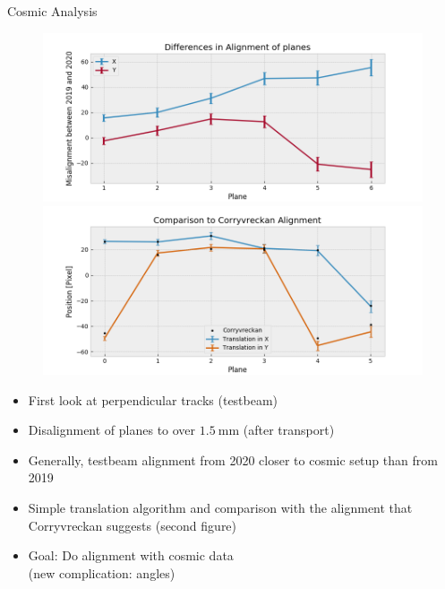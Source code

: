 \documentclass{beamer}
\begin{document}
\begin{frame}{Cosmic Analysis}
    \footnotesize
    \begin{minipage}{.6\textwidth}
    \begin{figure}[H]
	\centering
	\includegraphics[trim=30 0 50 0, clip, width=\textwidth]{Misalignment.png}\\
	\includegraphics[trim=30 0 50 0, clip, width=\textwidth]{Corry.png}
    \end{figure}
    \end{minipage}
    \begin{minipage}{.39\textwidth}
	\begin{itemize}
	    \item First look at perpendicular tracks (testbeam)
	    \item Disalignment of planes to over \( 1.5 \ \si{\milli \meter} \)
		(after transport)
	    \item Generally, testbeam alignment from 2020 closer to cosmic
		setup than from 2019
	    \item Simple translation algorithm and comparison with the alignment
		that Corryvreckan suggests (second figure)
	    \item Goal: Do alignment with cosmic data \\[3pt] \tiny (new complication: angles)
	\end{itemize}
    \end{minipage}
\end{frame}
\end{document}
